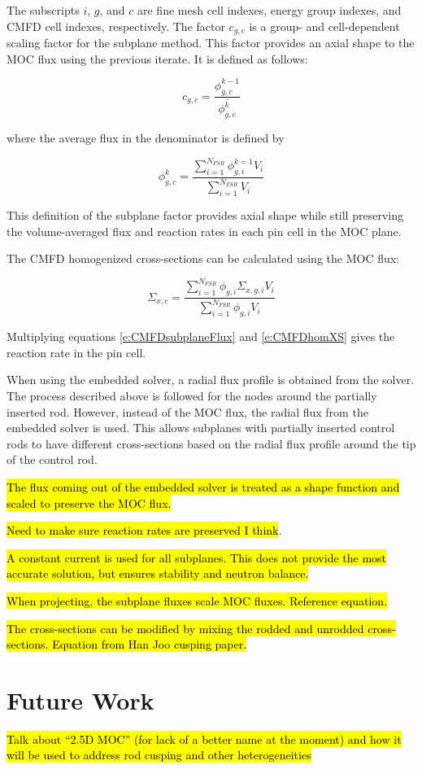 The subscripts $i$, $g$, and $c$ are fine mesh cell indexes, energy group indexes, and CMFD cell indexes, respectively.  The factor $c_{g,c}$ is a group- and cell-dependent scaling factor for the subplane method.  This factor provides an axial shape to the MOC flux using the previous iterate.  It is defined as follows:

\begin{equation}\label{e:CMFDsubplaneFactor}
c_{g,c} = \frac{\phi^{k-1}_{g,c}}{\overline{\phi^k_{g,c}}}
\end{equation}

where the average flux in the denominator is defined by

\begin{equation}\label{e:CMFDaverageFlux}
\phi^k_{g,c} = \frac{\sum_{i=1}^{N_{FSR}} \phi^{k=1}_{g,i} V_i}{\sum_{i=1}^{N_{FSR}} V_i}
\end{equation}

This definition of the subplane factor provides axial shape while still preserving the volume-averaged flux and reaction rates in each pin cell in the MOC plane.

The CMFD homogenized cross-sections can be calculated using the MOC flux:

\begin{equation}\label{e:CMFDhomXS}
\Sigma_{x,c} = \frac{\sum_{i=1}^{N_{FSR}} \phi_{g,i}\Sigma_{x,g,i}V_i}{\sum_{i=1}^{N_{FSR}} \phi_{g,i}V_i}
\end{equation}

Multiplying equations \ref{e:CMFDsubplaneFlux} and \ref{e:CMFDhomXS} gives the reaction rate in the pin cell.

When using the embedded solver, a radial flux profile is obtained from the solver.  The process described above is followed for the nodes around the partially inserted rod.  However, instead of the MOC flux, the radial flux from the embedded solver is used.  This allows subplanes with partially inserted control rods to have different cross-sections based on the radial flux profile around the tip of the control rod.

\hl{The flux coming out of the embedded solver is treated as a shape function and scaled to preserve the MOC flux.}

\hl{Need to make sure reaction rates are preserved I think}.

\hl{A constant current is used for all subplanes.  This does not provide the most accurate solution, but ensures stability and neutron balance.}

\hl{When projecting, the subplane fluxes scale MOC fluxes.  Reference equation.}

\hl{The cross-sections can be modified by mixing the rodded and unrodded cross-sections.  Equation from Han Joo cusping paper.}

\section{Future Work}

\hl{Talk about ``2.5D MOC'' (for lack of a better name at the moment) and how it will be used to address rod cusping and other heterogeneities}